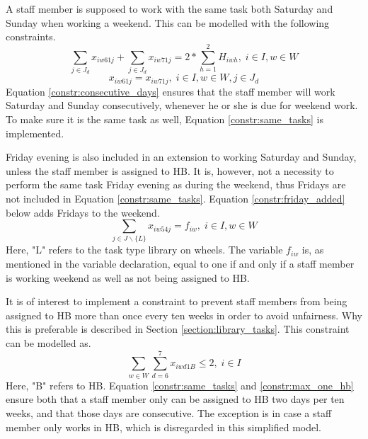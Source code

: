 A staff member is supposed to work with the same task both Saturday and Sunday when working a weekend. This can be modelled with the following constraints.
\begin{equation} \label{constr:consecutive_days}
\sum_{j \in J_d} x_{iw61j} + \sum_{j \in J_d} x_{iw71j} = 2*\sum_{h = 1}^{2} H_{iwh}, \;   i\in I, w \in W
\end{equation}
\begin{equation} \label{constr:same_tasks}
x_{iw61j} = x_{iw71j}, \;   i\in I, w \in W, j \in J_d
\end{equation}
Equation \ref{constr:consecutive_days} ensures that the staff member will work Saturday and Sunday consecutively, whenever he or she is due for weekend work. To make sure it is the same task as well, Equation \ref{constr:same_tasks} is implemented.

Friday evening is also included in an extension to working Saturday and Sunday, unless the staff member is assigned to HB. It is, however, not a necessity to perform the same task Friday evening as during the weekend, thus Fridays are not included in Equation \ref{constr:same_tasks}. Equation \ref{constr:friday_added} below adds Fridays to the weekend.
\begin{equation} \label{constr:friday_added}
\sum_{j \in J \backslash \{L\}}x_{iw54j} = f_{iw}, \;   i \in I, w \in W
\end{equation}
Here, "L" refers to the task type library on wheels. The variable $f_{iw}$ is, as mentioned in the variable declaration, equal to one if and only if a staff member is working weekend as well as not being assigned to HB.

It is of interest to implement a constraint to prevent staff members from being assigned to HB more than once every ten weeks in order to avoid unfairness. Why this is preferable is described in Section \ref{section:library_tasks}. This constraint can be modelled as.
\begin{equation} \label{constr:max_one_hb}
\sum_{w \in W}\sum_{d = 6}^{7}x_{iwd1B} \leq 2, \;   i \in I
\end{equation}
Here, "B" refers to HB. Equation \ref{constr:same_tasks} and \ref{constr:max_one_hb} ensure both that a staff member only can be assigned to HB two days per ten weeks, and that those days are consecutive. The exception is in case a staff member only works in HB, which is disregarded in this simplified model.

